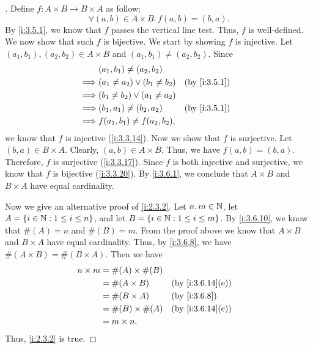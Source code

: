 \begin{proof}[]
  Define \(f : A \times B \to B \times A\) as follow:
  \[
    \forall (a, b) \in A \times B : f(a, b) = (b, a).
  \]
  By \cref{i:3.5.1}, we know that \(f\) passes the vertical line test.
  Thus, \(f\) is well-defined.
  We now show that such \(f\) is bijective.
  We start by showing \(f\) is injective.
  Let \((a_1, b_1), (a_2, b_2) \in A \times B\) and \((a_1, b_1) \neq (a_2, b_2)\).
  Since
  \begin{align*}
             & (a_1, b_1) \neq (a_2, b_2)                           \\
    \implies & (a_1 \neq a_2) \lor (b_1 \neq b_2) &  & \by{i:3.5.1} \\
    \implies & (b_1 \neq b_2) \lor (a_1 \neq a_2)                   \\
    \implies & (b_1, a_1) \neq (b_2, a_2)         &  & \by{i:3.5.1} \\
    \implies & f(a_1, b_1) \neq f(a_2, b_2),
  \end{align*}
  we know that \(f\) is injective (\cref{i:3.3.14}).
  Now we show that \(f\) is surjective.
  Let \((b, a) \in B \times A\).
  Clearly, \((a, b) \in A \times B\).
  Thus, we have \(f(a, b) = (b, a)\).
  Therefore, \(f\) is surjective (\cref{i:3.3.17}).
  Since \(f\) is both injective and surjective, we know that \(f\) is bijective (\cref{i:3.3.20}).
  By \cref{i:3.6.1}, we conclude that \(A \times B\) and \(B \times A\) have equal cardinality.

  Now we give an alternative proof of \cref{i:2.3.2}.
  Let \(n, m \in \mathbb{N}\), let \(A = \left\lbrace i \in \mathbb{N} : 1 \leq i \leq n\right\rbrace\), and let \(B = \left\lbrace i \in \mathbb{N} : 1 \leq i \leq m\right\rbrace\).
  By \cref{i:3.6.10}, we know that \(\#(A) = n\) and \(\#(B) = m\).
  From the proof above we know that \(A \times B\) and \(B \times A\) have equal cardinality.
  Thus, by \cref{i:3.6.8}, we have \(\#(A \times B) = \#(B \times A)\).
  Then we have
  \begin{align*}
    n \times m & = \#(A) \times \#(B)                       \\
               & = \#(A \times B)     &  & \by{i:3.6.14}[e] \\
               & = \#(B \times A)     &  & \by{i:3.6.8}     \\
               & = \#(B) \times \#(A) &  & \by{i:3.6.14}[e] \\
               & = m \times n.
  \end{align*}
  Thus, \cref{i:2.3.2} is true.
\end{proof}

